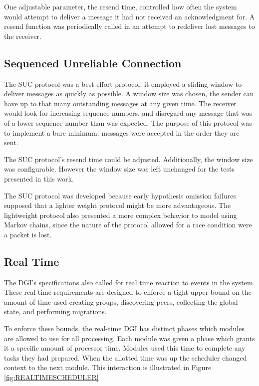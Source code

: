 One adjustable parameter, the resend time, controlled how often the system would attempt to deliver a message it had not received an acknowledgment for.
A resend function was periodically called in an attempt to redeliver lost messages to the receiver.

\subsection{Sequenced Unreliable Connection}
The SUC protocol was a best effort protocol: it employed a sliding window to deliver messages as quickly as possible.
A window size was chosen, the sender can have up to that many outstanding messages at any given time.
The receiver would look for increasing sequence numbers, and disregard any message that was of a lower sequence number than was expected.
The purpose of this protocol was to implement a bare minimum: messages were accepted in the order they are sent.

The SUC protocol's resend time could be adjusted. 
Additionally, the window size was configurable. 
However the window size was left unchanged for the tests presented in this work.

The SUC protocol was developed because early hypothesis omission failures supposed that a lighter weight protocol might be more advantageous.
The lightweight protocol also presented a more complex behavior to model using Markov chains, since the nature of the protocol allowed for a race condition were a packet is lost.

\subsection{Real Time}
The DGI's specifications also called for real time reaction to events in the system.
These real-time requirements are designed to enforce a tight upper bound on the amount of time used creating groups, discovering peers, collecting the global state, and performing migrations.

To enforce these bounds, the real-time DGI has distinct phases which modules are allowed to use for all processing.
Each module was given a phase which grants it a specific amount of processor time.
Modules used this time to complete any tasks they had prepared.
When the allotted time was up the scheduler changed context to the next module.
This interaction is illustrated in Figure \ref{fig:REALTIMESCHEDULER}

